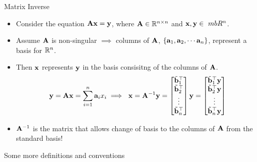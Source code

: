 \documentclass[aspectratio=169]{beamer}
\begin{document}
\begin{frame}[t]{Matrix Inverse}
\begin{itemize}
    \item Consider the equation $\mathbf{Ax} = \mathbf{y}$, where $\mathbf{A} \in \mathbb{R}^{n \times n}$ and $\mf{x}, \mf{y} \in \ mb{R}^n$. 

    \item Assume $\mathbf{A}$ is non-singular $\implies$ columns of $\mathbf{A}$, $\left\{ \mathbf{a}_1, \mathbf{a}_2, \cdots \mathbf{a}_n\right\}$, represent a basis for $\mathbb{R}^n$.

    \item Then $\mathbf{x}$ represents $\mathbf{y}$ in the basis consisitng of the columns of $\mathbf{A}$.
    \[ \mf{y} = \mf{Ax} = \sum_{i=1}^{n}\mf{a}_i x_i \implies \,\, \mf{x} = \mf{A}^{-1}\mf{y} = \begin{bmatrix*}\tilde{\mf{b}}_1^\top \\ \tilde{\mf{b}}_2^\top \\ \vdots \\ \tilde{\mf{b}}_n^\top\end{bmatrix*}\mf{y} = \begin{bmatrix*}\tilde{\mf{b}}_1^\top\mf{y} \\ \tilde{\mf{b}}_2^\top\mf{y} \\ \vdots \\ \tilde{\mf{b}}_n^\top\mf{y}\end{bmatrix*} \]
    \item $\mathbf{A}^{-1}$ is the matrix that allows change of basis to the columns of $\mathbf{A}$ from the standard basis!
  \end{itemize}
\end{frame}


\begin{frame}{Some more definitions and conventions}
\end{frame}
\end{document}
